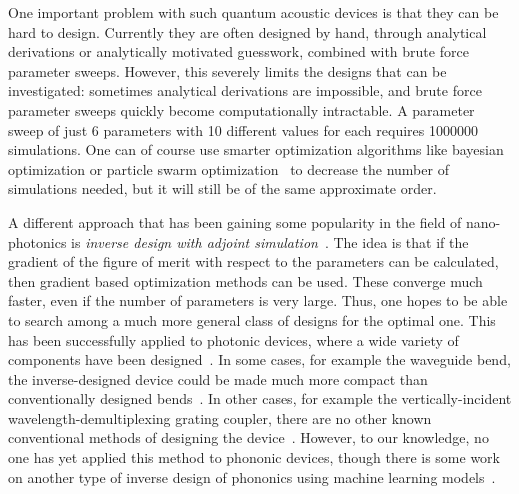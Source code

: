 One important problem with such quantum acoustic devices is that they can be hard to design.
Currently they are often designed by hand,
through analytical derivations or analytically motivated guesswork,
combined with brute force parameter sweeps.
However, this severely limits the designs that can be investigated:
sometimes analytical derivations are impossible, and brute force parameter
sweeps quickly become computationally intractable.
A parameter sweep of just 6 parameters with 10 different values for each
requires \num{1000000} simulations.
One can of course use smarter optimization algorithms like bayesian optimization
or particle swarm optimization~\cite{schneider2019benchmarking,zhang_compact_2013}
to decrease the number of simulations needed, but it will still be of the
same approximate order.

A different approach that has been gaining some popularity in the field of
nano-photonics is \emph{inverse design with adjoint
simulation}~\cite{molesky_inverse_2018}.
The idea is that if the gradient of the figure of merit
with respect to the parameters can be calculated, then gradient based
optimization methods can be used.
These converge much faster, even if the number of
parameters is very large. Thus, one hopes to be able to search
among a much more general class of designs for the optimal one.
This has been successfully applied to photonic devices,
where a wide variety of components have been designed~\cite{spins2019}.
In some cases, for example the waveguide bend, the inverse-designed device could
be made much more compact than conventionally designed
bends~\cite{jensen_systematic_2004}.
In other cases, for example the vertically-incident wavelength-demultiplexing
grating coupler, there are no other known conventional methods of designing the
device~\cite{piggott_inverse_2014}.
However, to our knowledge, no one has yet applied this method to phononic
devices, though there is some work on another type of inverse design of
phononics using machine learning models~\cite{han_deep-learning-based_2022}.


